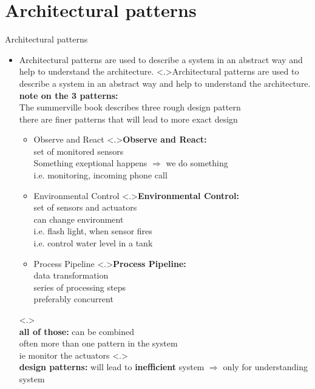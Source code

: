 \documentclass[ngerman={babel}, utf8, bigger, t, xcolor={table,dvipsnames}, ompress, hyperref={bookmarks,colorlinks},red]{beamer}
\begin{document}
\section{Architectural patterns}
\begin{frame}{Architectural patterns}
	\begin{itemize}
		\item Architectural patterns are used to describe a system in an abstract way and help to understand the architecture.
		\note<.>{Architectural patterns are used to describe a system in an abstract way and help to understand the architecture. \\ \vspace*{2em} \textbf{note on the 3 patterns:}\\ The summerville book describes three rough design pattern \\ there are finer patterns that will lead to more exact design}
		\begin{itemize}
			\item Observe and React
			\note<.>{\textbf{Observe and React:}\\ set of monitored sensors \\ Something exeptional happens $\Rightarrow$ we do something \\ i.e. monitoring, incoming phone call}
			\item Environmental Control
			\note<.>{\textbf{Environmental Control:}\\ set of sensors and actuators \\ can change environment \\ i.e. flash light, when sensor fires \\i.e. control water level in a tank}
			\item Process Pipeline
			\note<.>{\textbf{Process Pipeline:}\\ data transformation \\ series of processing steps\\ preferably concurrent}
		\end{itemize}
		\note<.>{\\ \vspace*{1em} \textbf{all of those:} can be combined \\ often more than one pattern in the system \\ ie monitor the actuators}
		\note<.>{\ \\ \vspace*{1em} \textbf{design patterns:} will lead to \textbf{inefficient} system $\Rightarrow$ only for understanding system}
		\end{itemize}
\end{frame}
\end{document}
